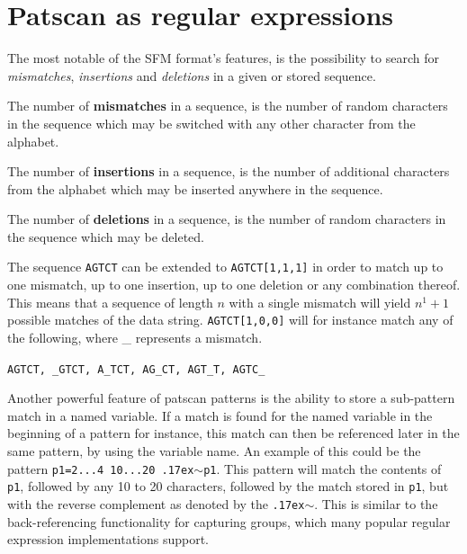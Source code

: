 \documentclass[12pt]{article}
\theoremstyle{definition}
\begin{document}
\section{Patscan as regular expressions}

The most notable of the SFM format's features, is the possibility to search for \textit{mismatches}, \textit{insertions} and \textit{deletions} in a given or stored sequence. 

\begin{definition}
	The number of \textbf{mismatches} in a sequence, is the number of random characters in the sequence which may be switched with any other character from the alphabet.
\end{definition}

\begin{definition}
	The number of \textbf{insertions} in a sequence, is the number of additional characters from the alphabet which may be inserted anywhere in the sequence.
\end{definition}

\begin{definition}
	The number of \textbf{deletions} in a sequence, is the number of random characters in the sequence which may be deleted.
\end{definition}

The sequence \texttt{AGTCT} can be extended to \texttt{AGTCT[1,1,1]} in order to match up to one mismatch, up to one insertion, up to one deletion or any combination thereof. This means that a sequence of length $n$ with a single mismatch will yield $n^1+1$ possible matches of the data string. \texttt{AGTCT[1,0,0]} will for instance match any of the following, where \_ represents a mismatch.

\texttt{AGTCT, \_GTCT, A\_TCT, AG\_CT, AGT\_T, AGTC\_}

Another powerful feature of patscan patterns is the ability to store a sub-pattern match in a named variable. If a match is found for the named variable in the beginning of a pattern for instance, this match can then be referenced later in the same pattern, by using the variable name. An example of this could be the pattern \texttt{p1=2...4 10...20 {\raise.17ex\hbox{$\scriptstyle\mathtt{\sim}$}}p1}. This pattern will match the contents of \texttt{p1}, followed by any 10 to 20 characters, followed by the match stored in \texttt{p1}, but with the reverse complement as denoted by the \texttt{{\raise.17ex\hbox{$\scriptstyle\mathtt{\sim}$}}}. This is similar to the back-referencing functionality for capturing groups, which many popular regular expression implementations support.
\end{document}
